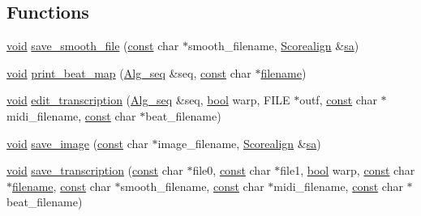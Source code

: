 \subsection*{Functions}
\begin{DoxyCompactItemize}
\item 
\hyperlink{sound_8c_ae35f5844602719cf66324f4de2a658b3}{void} \hyperlink{lib-src_2libscorealign_2main_8cpp_af4ceae4cce9a48fdb35453cd6059fe72}{save\+\_\+smooth\+\_\+file} (\hyperlink{getopt1_8c_a2c212835823e3c54a8ab6d95c652660e}{const} char $\ast$smooth\+\_\+filename, \hyperlink{class_scorealign}{Scorealign} \&\hyperlink{lib-src_2libscorealign_2main_8cpp_a1aa9083626d69f94349750d974f0359a}{sa})
\item 
\hyperlink{sound_8c_ae35f5844602719cf66324f4de2a658b3}{void} \hyperlink{lib-src_2libscorealign_2main_8cpp_a4af4ae16fcb94d013886626659766194}{print\+\_\+beat\+\_\+map} (\hyperlink{class_alg__seq}{Alg\+\_\+seq} \&seq, \hyperlink{getopt1_8c_a2c212835823e3c54a8ab6d95c652660e}{const} char $\ast$\hyperlink{test__portburn_8cpp_a7efa5e9c7494c7d4586359300221aa5d}{filename})
\item 
\hyperlink{sound_8c_ae35f5844602719cf66324f4de2a658b3}{void} \hyperlink{lib-src_2libscorealign_2main_8cpp_a58dea0247084953b4385cb710b9ae3eb}{edit\+\_\+transcription} (\hyperlink{class_alg__seq}{Alg\+\_\+seq} \&seq, \hyperlink{mac_2config_2i386_2lib-src_2libsoxr_2soxr-config_8h_abb452686968e48b67397da5f97445f5b}{bool} warp, F\+I\+LE $\ast$outf, \hyperlink{getopt1_8c_a2c212835823e3c54a8ab6d95c652660e}{const} char $\ast$midi\+\_\+filename, \hyperlink{getopt1_8c_a2c212835823e3c54a8ab6d95c652660e}{const} char $\ast$beat\+\_\+filename)
\item 
\hyperlink{sound_8c_ae35f5844602719cf66324f4de2a658b3}{void} \hyperlink{lib-src_2libscorealign_2main_8cpp_a0db0ee3cc3ce61a59933e2578d5076b5}{save\+\_\+image} (\hyperlink{getopt1_8c_a2c212835823e3c54a8ab6d95c652660e}{const} char $\ast$image\+\_\+filename, \hyperlink{class_scorealign}{Scorealign} \&\hyperlink{lib-src_2libscorealign_2main_8cpp_a1aa9083626d69f94349750d974f0359a}{sa})
\item 
\hyperlink{sound_8c_ae35f5844602719cf66324f4de2a658b3}{void} \hyperlink{lib-src_2libscorealign_2main_8cpp_a23b2552c1c76e177a4ba838947812ac9}{save\+\_\+transcription} (\hyperlink{getopt1_8c_a2c212835823e3c54a8ab6d95c652660e}{const} char $\ast$file0, \hyperlink{getopt1_8c_a2c212835823e3c54a8ab6d95c652660e}{const} char $\ast$file1, \hyperlink{mac_2config_2i386_2lib-src_2libsoxr_2soxr-config_8h_abb452686968e48b67397da5f97445f5b}{bool} warp, \hyperlink{getopt1_8c_a2c212835823e3c54a8ab6d95c652660e}{const} char $\ast$\hyperlink{test__portburn_8cpp_a7efa5e9c7494c7d4586359300221aa5d}{filename}, \hyperlink{getopt1_8c_a2c212835823e3c54a8ab6d95c652660e}{const} char $\ast$smooth\+\_\+filename, \hyperlink{getopt1_8c_a2c212835823e3c54a8ab6d95c652660e}{const} char $\ast$midi\+\_\+filename, \hyperlink{getopt1_8c_a2c212835823e3c54a8ab6d95c652660e}{const} char $\ast$beat\+\_\+filename)

\end{DoxyCompactItemize}
